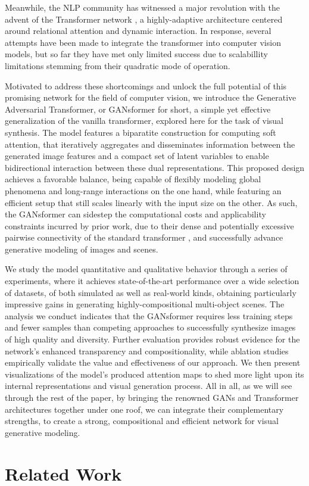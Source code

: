 \documentclass{article}
\begin{document}
Meanwhile, the NLP community has witnessed a major revolution with the advent of the Transformer network \citep{transformer}, a highly-adaptive architecture centered around relational attention and dynamic interaction. In response, several attempts have been made to integrate the transformer into computer vision models, but so far they have met only limited success due to scalabillity limitations stemming from their quadratic mode of operation.

Motivated to address these shortcomings and unlock the full potential of this promising network for the field of computer vision, we introduce the Generative Adversarial Transformer, or GANsformer for short, a simple yet effective generalization of the vanilla transformer, explored here for the task of visual synthesis. The model features a biparatite construction for computing soft attention, that iteratively aggregates and disseminates information between the generated image features and a compact set of latent variables to enable bidirectional interaction between these dual representations. This proposed design achieves a favorable balance, being capable of flexibly modeling global phenomena and long-range interactions on the one hand, while featuring an efficient setup that still scales linearly with the input size on the other. As such, the GANsformer can sidestep the computational costs and applicability constraints incurred by prior work, due to their dense and potentially excessive pairwise connectivity of the standard transformer \citep{sagan,biggan}, and successfully advance generative modeling of images and scenes. 

We study the model quantitative and qualitative behavior through a series of experiments, where it achieves state-of-the-art performance over a wide selection of datasets, of both simulated as well as real-world kinds, obtaining particularly impressive gains in generating highly-compositional multi-object scenes. The analysis we conduct  indicates that the GANsformer requires less training steps and fewer samples than competing approaches to successfully synthesize images of high quality and diversity. Further evaluation provides robust evidence for the network's enhanced transparency and compositionality, while ablation studies empirically validate the value and effectiveness of our approach. We then present visualizations of the model's produced attention maps to shed more light upon its internal representations and visual generation process. All in all, as we will see through the rest of the paper, by bringing the renowned GANs and Transformer architectures together under one roof, we can integrate their complementary strengths, to create a strong, compositional and efficient network for visual generative modeling. \section{Related Work}
\label{related}
\end{document}

